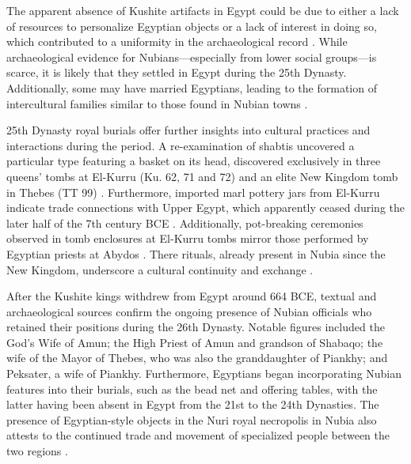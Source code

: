 The apparent absence of Kushite artifacts in Egypt could be due to either a lack of resources to personalize Egyptian objects or a lack of interest in doing so, which contributed to a uniformity in the archaeological record \parencite[p.~494]{howleyKushitesEgypt6642020}. While archaeological evidence for Nubians—especially from lower social groups—is scarce, it is likely that they settled in Egypt during the 25th Dynasty. Additionally, some may have married Egyptians, leading to the formation of intercultural families similar to those found in Nubian towns \parencite[p.~477]{budkaNubiansEgypt25th2020}.

25th Dynasty royal burials offer further insights into cultural practices and interactions during the period. A re-examination of shabtis uncovered a particular type featuring a basket on its head, discovered exclusively in three queens’ tombs at El-Kurru (Ku. 62, 71 and 72) and an elite New Kingdom tomb in Thebes (TT 99) \parencite{mussoKushiteShabtisBasket2011}. Furthermore, imported marl pottery jars from El-Kurru indicate trade connections with Upper Egypt, which apparently ceased during the later half of the 7th century BCE \parencite{heidornBostonMuseumFine2018}. Additionally, pot-breaking ceremonies observed in tomb enclosures at El-Kurru tombs mirror those performed by Egyptian priests at Abydos \parencite{budkaEgyptianImpactPotBreaking2014}. There rituals, already present in Nubia since the New Kingdom, underscore a cultural continuity and exchange \parencites[p.~154, 165-166]{smithWretchedKushEthnic2003}[p.~120]{gasperiniAmaraWestCemeteries2023}.

After the Kushite kings withdrew from Egypt around 664 BCE, textual and archaeological sources confirm the ongoing presence of Nubian officials who retained their positions during the 26th Dynasty. Notable figures included the God's Wife of Amun; the High Priest of Amun and grandson of Shabaqo; the wife of the Mayor of Thebes, who was also the granddaughter of Piankhy; and Peksater, a wife of Piankhy. Furthermore, Egyptians began incorporating Nubian features into their burials, such as the bead net and offering tables, with the latter having been absent in Egypt from the 21st to the 24th Dynasties. The presence of Egyptian-style objects in the Nuri royal necropolis in Nubia also attests to the continued trade and movement of specialized people between the two regions \parencites[p.~514]{budkaKushiteTombGroups2010}[p.~494-498]{howleyKushitesEgypt6642020}.


